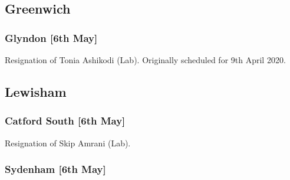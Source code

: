 \documentclass[a4paper,openany]{book}
\begin{document}
\begin{resultsiii}
%
%
%
%

\subsection*{Greenwich}

\subsubsection*{Glyndon \hspace*{\fill}\nolinebreak[1]%
	\enspace\hspace*{\fill}
	[6th May]}


Resignation of Tonia Ashikodi (Lab).  Originally scheduled for 9th April 2020.

\subsection*{Lewisham}

\subsubsection*{Catford South \hspace*{\fill}\nolinebreak[1]%
	\enspace\hspace*{\fill}
	[6th May]}


Resignation of Skip Amrani (Lab).

\subsubsection*{Sydenham \hspace*{\fill}\nolinebreak[1]%
	\enspace\hspace*{\fill}
	[6th May]}


\end{resultsiii}
\end{document}
